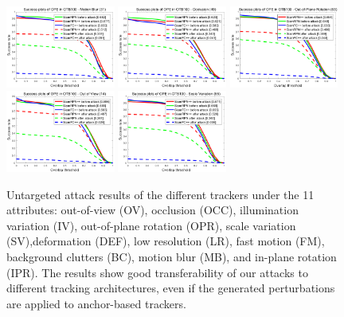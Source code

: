 \documentclass[journal]{IEEEtran}
\begin{document}
\begin{figure}[t!]
\begin{center}
    \includegraphics[width=0.32\textwidth]{images/OTB2015/success_plot_OPE_OTB100_MB.png}
    \includegraphics[width=0.32\textwidth]{images/OTB2015/success_plot_OPE_OTB100_OCC.png}
    \includegraphics[width=0.32\textwidth]{images/OTB2015/success_plot_OPE_OTB100_OPR.png}
    \includegraphics[width=0.32\textwidth]{images/OTB2015/success_plot_OPE_OTB100_OV.png}
    \includegraphics[width=0.32\textwidth]{images/OTB2015/success_plot_OPE_OTB100_SV.png}
  \end{center}
      \caption{Untargeted attack results of the different trackers under the 11 attributes: out-of-view (OV), occlusion (OCC), illumination variation (IV), out-of-plane rotation (OPR), scale variation (SV),deformation (DEF), low resolution (LR), fast motion (FM), background clutters (BC), motion blur (MB), and in-plane rotation (IPR). The results show good transferability of our attacks to different tracking architectures, even if the generated perturbations are applied to anchor-based trackers.}
  \label{fig:attr}
\end{figure}
\end{document}
